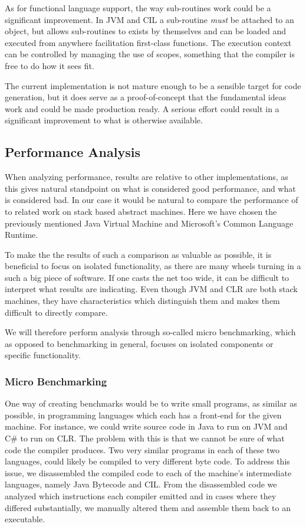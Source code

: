 As for functional language support, the way sub-routines work could be a
significant improvement. In JVM and CIL a sub-routine \emph{must} be attached to
an object, but \thename{} allows sub-routines to exists by themselves and can be
loaded and executed from anywhere facilitation first-class functions. The
execution context can be controlled by managing the use of scopes, something
that the compiler is free to do how it sees fit.

The current implementation is not mature enough to be a sensible target for code
generation, but it does serve as a proof-of-concept that the fundamental ideas
work and could be made production ready. A serious effort could result in a
significant improvement to what is otherwise available.

\subsection{Performance Analysis}
\label{sec:eval:performance}

When analyzing performance, results are relative to other implementations, as
this gives natural standpoint on what is considered good performance, and what
is considered bad. In our case it would be natural to compare the performance of
\thename{} to related work on stack based abstract machines. Here we have chosen
the previously mentioned Java Virtual Machine and Microsoft's Common Language
Runtime.

To make the the results of such a comparison as valuable as possible, it is
beneficial to focus on isolated functionality, as there are many wheels turning
in a such a big piece of software. If one casts the net too wide, it can be
difficult to interpret what results are indicating. Even though JVM and CLR are
both stack machines, they have characteristics which distinguish them and makes
them difficult to directly compare.

We will therefore perform analysis through so-called micro benchmarking, which
as opposed to benchmarking in general, focuses on isolated components or
specific functionality.

\subsubsection{Micro Benchmarking}

One way of creating benchmarks would be to write small programs, as similar as
possible, in programming languages which each has a front-end for the given
machine. For instance, we could write source code in Java to run on JVM and C\#
to run on CLR. The problem with this is that we cannot be sure of what code the
compiler produces. Two very similar programs in each of these two languages,
could likely be compiled to very different byte code. To address this issue, we
disassembled the compiled code to each of the machine's intermediate languages,
namely Java Bytecode and CIL. From the disassembled code we analyzed which
instructions each compiler emitted and in cases where they differed
substantially, we manually altered them and assemble them back to an executable.

